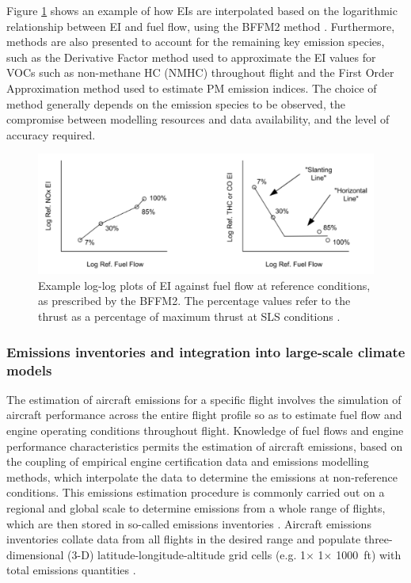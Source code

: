 Figure \ref{BFFM2} shows an example of how EIs are interpolated based on the logarithmic relationship between EI and fuel flow, using the BFFM2 method \cite{Wasiuk2014}. Furthermore, methods are also presented to account for the remaining key emission species, such as the Derivative Factor method \cite{AEDT} used to approximate the EI values for VOCs such as non-methane HC (NMHC) throughout flight and the First Order Approximation method \cite{Wayson2012} used to estimate PM emission indices. The choice of method generally depends on the emission species to be observed, the compromise between modelling resources and data availability, and the level of accuracy required.

\begin{figure}[H]
  \centering
  \includegraphics[width=0.9\linewidth]{BFFM2_output_example.png}
  \caption{Example log-log plots of EI against fuel flow at reference conditions, as prescribed by the BFFM2. The percentage values refer to the thrust as a percentage of maximum thrust at SLS conditions \cite{AIR5715}.}
  \label{BFFM2}
\end{figure}

\subsubsection{Emissions inventories and integration into large-scale climate models}
The estimation of aircraft emissions for a specific flight involves the simulation of aircraft performance across the entire flight profile so as to estimate fuel flow and engine operating conditions throughout flight. Knowledge of fuel flows and engine performance characteristics permits the estimation of aircraft emissions, based on the coupling of empirical engine certification data and emissions modelling methods, which interpolate the data to determine the emissions at non-reference conditions. This emissions estimation procedure is commonly carried out on a regional and global scale to determine emissions from a whole range of flights, which are then stored in so-called emissions inventories \cite{Wasiuk2016}. Aircraft emissions inventories collate data from all flights in the desired range and populate three-dimensional (3-D) latitude-longitude-altitude grid cells (e.g. 1\textdegree $\times$ 1\textdegree $\times$ 1000~ft) with total emissions quantities \cite{Paoli2011}. 

